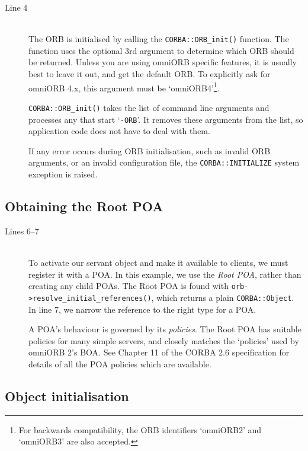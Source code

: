 \documentclass[11pt,oneside,a4paper]{book}
\newcommand{\type}[1]{\texttt{#1}}
\newcommand{\code}[1]{\texttt{#1}}
\newcommand{\op}[1]{\texttt{#1()}}
\newcommand{\term}[1]{\textit{#1}}
\newcommand{\dsc}{\discretionary{}{}{}}
\begin{document}
\begin{description}

\item[Line 4]\mbox{}\\
%
The ORB is initialised by calling the \op{CORBA::ORB\_init}
function. The function uses the optional 3rd argument to determine
which ORB should be returned. Unless you are using omniORB specific
features, it is usually best to leave it out, and get the default
ORB. To explicitly ask for omniORB 4.x, this argument must be
`omniORB4'\footnote{For backwards compatibility, the ORB identifiers
`omniORB2' and `omniORB3' are also accepted.}.

\op{CORBA::ORB\_init} takes the list of command line arguments and
processes any that start `\code{-ORB}'. It removes these arguments
from the list, so application code does not have to deal with them.

If any error occurs during ORB initialisation, such as invalid ORB
arguments, or an invalid configuration file, the
\code{CORBA::INITIALIZE} system exception is raised.

\end{description}


\subsection{Obtaining the Root POA}

\begin{description}

\item[Lines 6--7]\mbox{}\\
%
To activate our servant object and make it available to clients, we
must register it with a POA. In this example, we use the \term{Root
POA}, rather than creating any child POAs. The Root POA is found with
\op{orb->resolve\_initial\_\dsc{}references}, which returns a plain
\type{CORBA::Object}. In line 7, we narrow the reference to the right
type for a POA.

A POA's behaviour is governed by its \term{policies}. The Root POA has
suitable policies for many simple servers, and closely matches the
`policies' used by omniORB 2's BOA. See Chapter 11 of the CORBA 2.6
specification\cite{corba26-spec} for details of all the POA policies
which are available.

\end{description}


\subsection{Object initialisation}
\end{document}
